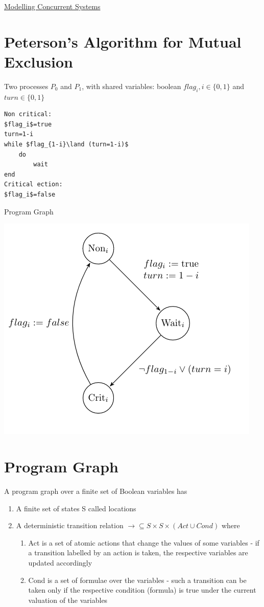 \documentclass{article}[18pt]
\begin{document}
\begin{center}
\underline{\huge Modelling Concurrent Systems}
\end{center}
\section{Peterson's Algorithm for Mutual Exclusion}
Two processes $P_0$ and $P_1$, with shared variables: boolean $flag_i,i\in\{0,1\}$ and $turn\in\{0,1\}$ 
\begin{lstlisting}[caption=Process $P_i$]
Non critical:
$flag_i$=true
turn=1-i
while $flag_{1-i}\land (turn=1-i)$
	do
		wait
end
Critical ection:
$flag_i$=false
\end{lstlisting}
Program Graph
\begin{center}
	\includegraphics[scale=0.7]{"Program Graph"}
\end{center}
\section{Program Graph}
\begin{definition}
A program graph over a finite set of Boolean variables has
\begin{enumerate}
	\item A finite set of states S called locations
	\item A deterministic transition relation $\rightarrow \subseteq S\times S \times (Act\cup Cond)$ where
	\begin{enumerate}
		\item Act is a set of atomic actions that change the values of some variables - if a transition labelled by an action is taken, the respective variables are updated accordingly
		\item Cond is a set of formulae over the variables - such a transition can be taken only if the respective condition (formula) is true under the current valuation of the variables
	\end{enumerate}
\end{enumerate}
\end{definition}
\end{document}

